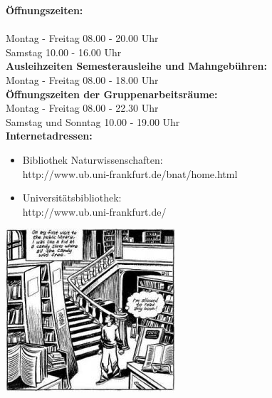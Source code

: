 \begin{minipage}{0.5\textwidth}
\noindent
\textbf{Öffnungszeiten:}\\\\
Montag - Freitag 08.00 - 20.00 Uhr\\
Samstag 10.00 - 16.00 Uhr\\


\noindent
\textbf{Ausleihzeiten Semesterausleihe und Mahngebühren:}\\
Montag - Freitag  08.00 - 18.00 Uhr\\


\noindent
\textbf{Öffnungszeiten der Gruppenarbeitsräume:}\\
Montag - Freitag  08.00 - 22.30 Uhr\\
Samstag und Sonntag 10.00 - 19.00 Uhr\\


\noindent
\textbf{Internetadressen:} 
\begin{itemize}
   \item{Bibliothek Naturwissenschaften:}\\
    http://www.ub.uni-frankfurt.de/bnat/home.html
   \item{Universitätsbibliothek:}\\
      http://www.ub.uni-frankfurt.de/
\end{itemize}

\end{minipage}
\begin{minipage}{0.5\textwidth}
 \begin{center}
  \includegraphics[height=7 cm]{bilder/manga.jpg}
\end{center}
\end{minipage}


